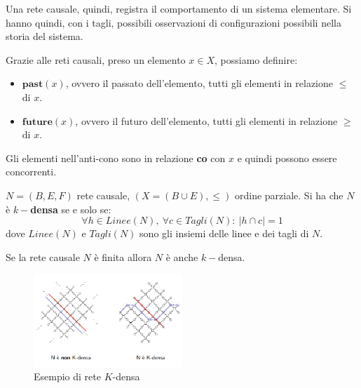 Una rete causale, quindi, registra il comportamento di un sistema elementare. Si
hanno quindi, con i tagli, possibili osservazioni di configurazioni possibili
nella storia del sistema.
\begin{definizione}
    Grazie alle reti causali, preso un elemento $x \in X$, possiamo definire:
    \begin{itemize}
        \item $\textbf{past}(x)$, ovvero il passato dell'elemento, tutti gli
              elementi in relazione $\leq$ di $x$.
        \item $\textbf{future}(x)$, ovvero il futuro dell'elemento, tutti gli
              elementi in relazione $\geq$ di $x$.
    \end{itemize}
    Gli elementi nell'anti-cono sono in relazione \textbf{co} con $x$ e quindi
    possono essere concorrenti.
\end{definizione}
\begin{definizione}
    $N = (B, E, F)$ rete causale, $(X = (B \cup E), \leq)$ ordine parziale. Si
    ha che $N$ è \textbf{$k-$densa} se e solo se:
    \begin{equation}
        \forall h \in Linee(N), \ \forall c \in Tagli(N): \ |h \cap c| = 1
    \end{equation}
    dove $Linee(N)$ e $Tagli(N)$ sono gli insiemi delle linee e dei tagli di $N$.
\end{definizione}
\begin{nota}
    Se la rete causale $N$ è finita allora $N$ è anche $k-$densa.
\end{nota}
\begin{figure}[!ht]
    \centering
    \includegraphics[width=0.5\textwidth]{img/reti/kdensa.png}
    \caption{Esempio di rete $K$-densa}
\end{figure}
